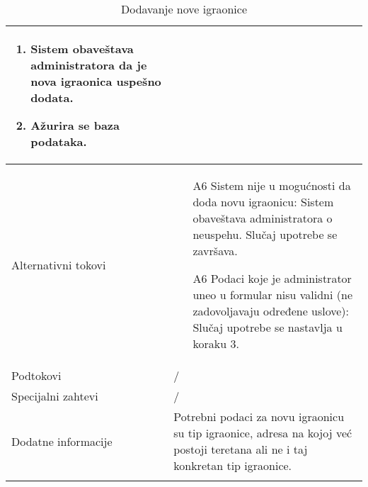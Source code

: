 \documentclass[../main.tex]{subfiles}
\begin{document}
\begin{longtable}{| p{} | p{} |}
\begin{enumerate}
        \item Sistem obaveštava administratora da je nova igraonica uspešno dodata. %
        \item Ažurira se baza podataka.
    \end{enumerate}\\
\hline
    Alternativni tokovi & \begin{itemize}
        \item[A6]  Sistem nije u mogućnosti da doda novu igraonicu: Sistem obaveštava administratora o neuspehu. Slučaj upotrebe se završava.
        \item[A6]  Podaci koje je administrator uneo u formular nisu validni (ne zadovoljavaju određene uslove): Slučaj upotrebe se nastavlja u koraku 3.
    \end{itemize}\\
\hline
    Podtokovi & /\\
\hline
    Specijalni zahtevi & /\\
\hline
    Dodatne informacije & Potrebni podaci za novu igraonicu su tip igraonice, adresa na kojoj već postoji teretana ali ne i taj konkretan tip igraonice.
    \\
\hline
\caption{Dodavanje nove igraonice} %
\end{longtable}
\end{document}
